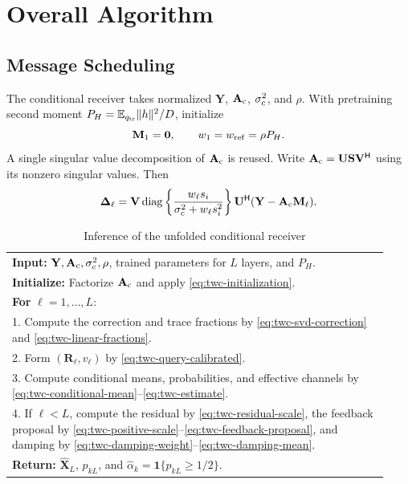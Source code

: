 \section{Overall Algorithm}
\label{sec:overall}

\subsection{Message Scheduling}

The conditional receiver takes normalized $\mathbf Y$,
$\mathbf A_{\rm c}$, $\sigma_{\rm c}^2$, and $\rho$.
With pretraining second moment $P_H=\mathbb{E}_{q_{\rm tr}}\|h\|^2/D$, initialize
\begin{equation}
 \mathbf M_1=\mathbf0,\qquad w_1=w_{\rm ref}=\rho P_H.
 \label{eq:twc-initialization}
\end{equation}
A single singular value decomposition of $\mathbf A_{\rm c}$ is
reused. Write $\mathbf A_{\rm c}=\mathbf U\mathbf S\mathbf V^{\mathsf H}$
using its nonzero singular values. Then
\begin{equation}
 \bm\Delta_\ell=\mathbf V
 \operatorname{diag}\left\{\frac{w_\ell s_i}{\sigma_{\rm c}^2+w_\ell s_i^2}\right\}
 \mathbf U^{\mathsf H}(\mathbf Y-\mathbf A_{\rm c}\mathbf M_\ell).
 \label{eq:twc-svd-correction}
\end{equation}

\begin{table}[t]
\centering
\caption{Inference of the unfolded conditional receiver}
\label{tab:twc-algorithm}
\begin{tabular}{p{0.93\linewidth}}
\toprule
\textbf{Input:} $\mathbf Y,\mathbf A_{\rm c},\sigma_{\rm c}^2,\rho$,
trained parameters for $L$ layers, and $P_H$.\\
\textbf{Initialize:} Factorize $\mathbf A_{\rm c}$ and apply
\eqref{eq:twc-initialization}.\\
\textbf{For} $\ell=1,\ldots,L$:\\
1. Compute the correction and trace fractions by
\eqref{eq:twc-svd-correction} and \eqref{eq:twc-linear-fractions}.\\
2. Form $(\mathbf R_\ell,v_\ell)$ by \eqref{eq:twc-query-calibrated}.\\
3. Compute conditional means, probabilities, and effective channels
by \eqref{eq:twc-conditional-mean}--\eqref{eq:twc-estimate}.\\
4. If $\ell<L$, compute the residual by \eqref{eq:twc-residual-scale},
the feedback proposal by \eqref{eq:twc-positive-scale}--\eqref{eq:twc-feedback-proposal},
and damping by \eqref{eq:twc-damping-weight}--\eqref{eq:twc-damping-mean}.\\
\textbf{Return:} $\widehat{\mathbf X}_L$, $p_{kL}$,
and $\widehat\alpha_k=\mathbf1\{p_{kL}\geq1/2\}$.\\
\bottomrule
\end{tabular}
\end{table}

